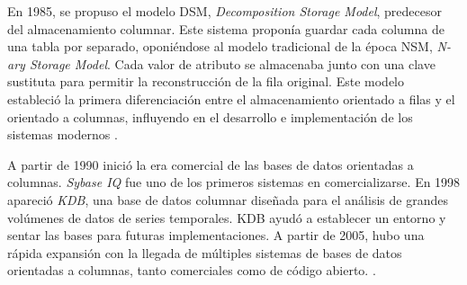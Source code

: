 En 1985, se propuso el modelo DSM, \textit{Decomposition Storage Model}, predecesor del almacenamiento columnar. Este sistema proponía guardar cada columna de una tabla por separado, oponiéndose al modelo tradicional de la época NSM, \textit{N-ary Storage Model}. Cada valor de atributo se almacenaba junto con una clave sustituta para permitir la reconstrucción de la fila original. Este modelo estableció la primera diferenciación entre el almacenamiento orientado a filas y el orientado a columnas, influyendo en el desarrollo e implementación de los sistemas modernos \parencite{abadi2013}.

A partir de 1990 inició la era comercial de las bases de datos orientadas a columnas. \textit{Sybase IQ} fue uno de los primeros sistemas en comercializarse. En 1998 apareció \textit{KDB}, una base de datos columnar diseñada para el análisis de grandes volúmenes de datos de series temporales. KDB ayudó a establecer un entorno y sentar las bases para futuras implementaciones. A partir de 2005, hubo una rápida expansión con la llegada de múltiples sistemas de bases de datos orientadas a columnas, tanto comerciales como de código abierto. \parencite{whitney-history-kdb, kdb-intro-timestored}.